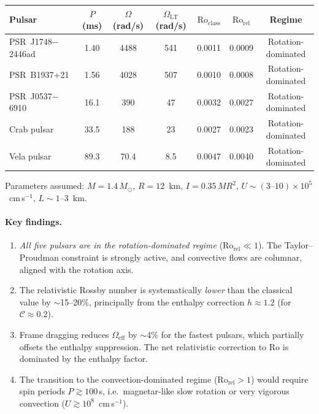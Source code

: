 \begin{center}
\renewcommand{\arraystretch}{1.25}
\begin{tabular}{lcccccc}
\hline
\textbf{Pulsar} & $P$ (ms) & $\Omega$ (rad/s)
  & $\Omega_{\mathrm{LT}}$ (rad/s) & $\mathrm{Ro}_{\mathrm{class}}$
  & $\mathrm{Ro}_{\mathrm{rel}}$ & \textbf{Regime} \\
\hline
PSR~J1748$-$2446ad & 1.40 & 4488 & 541 & 0.0011 & 0.0009
  & Rotation-dominated \\
PSR~B1937+21       & 1.56 & 4028 & 507 & 0.0010 & 0.0008
  & Rotation-dominated \\
PSR~J0537$-$6910   & 16.1 & 390  & 47  & 0.0032 & 0.0027
  & Rotation-dominated \\
Crab pulsar        & 33.5 & 188  & 23  & 0.0027 & 0.0023
  & Rotation-dominated \\
Vela pulsar        & 89.3 & 70.4 & 8.5 & 0.0047 & 0.0040
  & Rotation-dominated \\
\hline
\end{tabular}
\end{center}
\noindent Parameters assumed: $M = 1.4\,M_\odot$, $R = 12$~km,
$I = 0.35\,MR^2$, $U \sim (3\text{--}10)\times 10^5$~cm\,s$^{-1}$,
$L \sim 1\text{--}3$~km.

\paragraph{Key findings.}
\begin{enumerate}
\item \emph{All five pulsars are in the rotation-dominated regime}
  ($\mathrm{Ro}_{\mathrm{rel}} \ll 1$).  The Taylor--Proudman
  constraint is strongly active, and convective flows are
  columnar, aligned with the rotation axis.

\item The relativistic Rossby number is systematically
  \emph{lower} than the classical value by $\sim$15--20\%,
  principally from the enthalpy correction $h \approx 1.2$
  (for $\mathcal{C} \approx 0.2$).

\item Frame dragging reduces $\Omega_{\mathrm{eff}}$ by $\sim$4\%
  for the fastest pulsars, which partially offsets the enthalpy
  suppression.  The net relativistic correction to Ro is dominated
  by the enthalpy factor.

\item The transition to the convection-dominated regime
  ($\mathrm{Ro}_{\mathrm{rel}} > 1$) would require spin periods
  $P \gtrsim 100$\,s, i.e.\ magnetar-like slow rotation or
  very vigorous convection ($U \gtrsim 10^8$~cm\,s$^{-1}$).
\end{enumerate}

